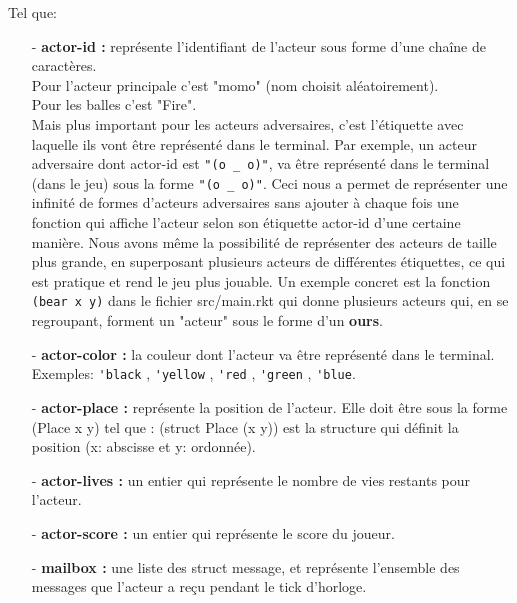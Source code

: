 \documentclass[a4paper]{article}
\begin{document}
Tel que:
\begin{itemize}
    \item[-] \textbf{actor-id :} représente l'identifiant de l'acteur sous forme d'une chaîne de caractères. \\Pour l'acteur principale c'est "momo" (nom choisit aléatoirement). \\Pour les balles c'est "Fire".\\ Mais plus important pour les acteurs adversaires, c'est l'étiquette avec laquelle ils vont être représenté dans le terminal. Par exemple, un acteur adversaire dont actor-id est \verb!"(o _ o)"!, va être représenté dans le terminal (dans le jeu) sous la forme \verb!"(o _ o)"!. Ceci nous a permet de représenter une infinité de formes d'acteurs adversaires sans ajouter à chaque fois une fonction qui affiche l'acteur selon son étiquette actor-id d'une certaine manière. Nous avons même la possibilité de représenter des acteurs de taille plus grande, en superposant plusieurs acteurs de différentes étiquettes, ce qui est pratique et rend le jeu plus jouable. Un exemple concret est la fonction \verb!(bear x y)! dans le fichier src/main.rkt qui donne plusieurs acteurs qui, en se regroupant, forment un "acteur" sous le forme d'un \textbf{ours}.
    \item[-] \textbf{actor-color :} la couleur dont l'acteur va être représenté dans le terminal.\\ Exemples: \verb!'black! , \verb!'yellow! , \verb!'red! , \verb!'green! , \verb!'blue!.
    \item[-] \textbf{actor-place :} représente la position de l'acteur. Elle doit être sous la forme (Place x y) tel que : (struct Place (x y)) est la structure qui définit la position (x: abscisse et y: ordonnée). 
    \item[-] \textbf{actor-lives :} un entier qui représente le nombre de vies restants pour l'acteur.
    \item[-] \textbf{actor-score :} un entier qui représente le score du joueur.
    \item[-] \textbf{mailbox :} une liste des struct message, et représente l'ensemble des messages que l'acteur a reçu pendant le tick d'horloge.
\end{itemize}
\end{document}
